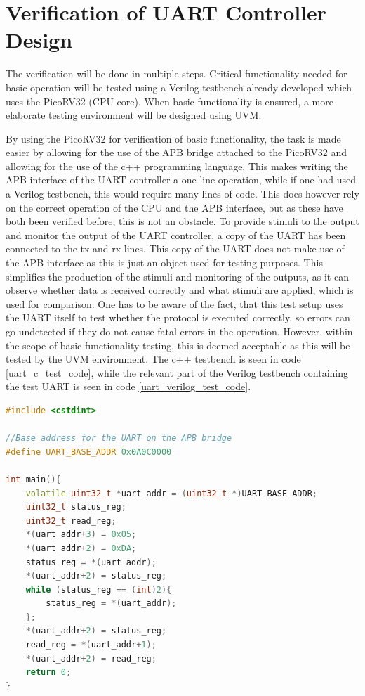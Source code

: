 \documentclass[./dissertation.tex]{subfiles}
\begin{document}
\section{Verification of UART Controller Design}
The verification will be done in multiple steps. Critical functionality needed for basic operation will be tested using a Verilog testbench already developed which uses the PicoRV32 (CPU core). When basic functionality is ensured, a more elaborate testing environment will be designed using UVM.

By using the PicoRV32 for verification of basic functionality, the task is made easier by allowing for the use of the APB bridge attached to the PicoRV32 and allowing for the use of the c++ programming language. This makes writing the APB interface of the UART controller a one-line operation, while if one had used a Verilog testbench, this would require many lines of code. This does however rely on the correct operation of the CPU and the APB interface, but as these have both been verified before, this is not an obstacle. To provide stimuli to the output and monitor the output of the UART controller, a copy of the UART has been connected to the tx and rx lines. This copy of the UART does not make use of the APB interface as this is just an object used for testing purposes. This simplifies the production of the stimuli and monitoring of the outputs, as it can observe whether data is received correctly and what stimuli are applied, which is used for comparison. One has to be aware of the fact, that this test setup uses the UART itself to test whether the protocol is executed correctly, so errors can go undetected if they do not cause fatal errors in the operation. However, within the scope of basic functionality testing, this is deemed acceptable as this will be tested by the UVM environment. The c++ testbench is seen in code \ref{uart_c_test_code}, while the relevant part of the Verilog testbench containing the test UART is seen in code \ref{uart_verilog_test_code}. 

\begin{lstlisting}[caption={C++ code for basic functionality testing of the UART controller},label={uart_c_test_code},language=C++]
#include <cstdint>

//Base address for the UART on the APB bridge
#define UART_BASE_ADDR 0x0A0C0000

int main(){
    volatile uint32_t *uart_addr = (uint32_t *)UART_BASE_ADDR;
    uint32_t status_reg;
    uint32_t read_reg;
    *(uart_addr+3) = 0x05;
    *(uart_addr+2) = 0xDA;
    status_reg = *(uart_addr);
    *(uart_addr+2) = status_reg;
    while (status_reg == (int)2){
        status_reg = *(uart_addr);
    };
    *(uart_addr+2) = status_reg;
    read_reg = *(uart_addr+1);
    *(uart_addr+2) = read_reg;
    return 0;
}
\end{lstlisting}
\end{document}
